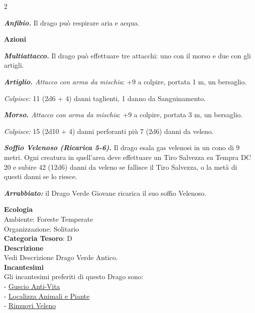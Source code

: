 \begin{multicols}{2}
{\emph{\textbf{Anfibio.}} Il drago può respirare aria e acqua.

\textbf{Azioni}

\emph{\textbf{Multiattacco.}} Il drago può effettuare tre attacchi: uno con il morso e due con gli artigli.

\emph{\textbf{Artiglio.} Attacco con arma da mischia}: +9 a colpire, portata 1 m, un bersaglio.

\emph{Colpisce:} 11 (2d6 + 4) danni taglienti, 1 danno da Sanguinamento.

\emph{\textbf{Morso.} Attacco con arma da mischia}: +9 a colpire, portata 3 m, un bersaglio.

\emph{Colpisce:} 15 (2d10 + 4) danni perforanti più 7 (2d6) danni da veleno.

\emph{\textbf{Soffio Velenoso (Ricarica 5-6).}} Il drago esala gas velenosi in un cono di 9 metri. Ogni creatura in quell'area deve effettuare un Tiro Salvezza su Tempra DC 20 e subire 42 (12d6) danni da veleno se fallisce il Tiro Salvezza, o la metà di questi danni se lo riesce.

\emph{\textbf{Arrabbiato:}} il Drago Verde Giovane ricarica il suo soffio Velenoso.

\textbf{Ecologia}\\
Ambiente: Foreste Temperate\\
Organizzazione: Solitario\\
\textbf{Categoria Tesoro}: D\\
\textbf{Descrizione}\\
Vedi Descrizione Drago Verde Antico.\\
\textbf{Incantesimi}\\
Gli incantesimi preferiti di questo Drago sono:\\
- \hyperlink{Guscio Anti-Vita}{Guscio Anti-Vita}\\
- \hyperlink{Localizza Animali e Piante}{Localizza Animali e Piante}\\
- \hyperlink{Rimuovi Veleno}{Rimuovi Veleno}

}
\end{multicols}
